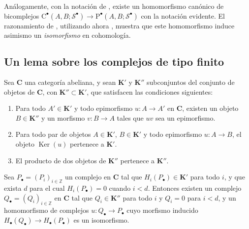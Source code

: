 \begin{env}[11.8.10]
\label{0.11.8.10}
\label{0.11.8.10-fr}
Análogamente, con la notación de , existe un
homomorfismo canónico de bicomplejos
$\mathrm C^\bullet(A,B;\mathscr S^\bullet)\to
\mathrm P^\bullet(A,B;\mathscr S^\bullet)$
con la notación evidente.
El razonamiento de , utilizando ahora , muestra que
este homomorfismo induce asimismo un \emph{isomorfismo} en cohomología.
\end{env}

\subsection{Un lema sobre los complejos de tipo finito}
\label{subsection:0.11.9}
\label{subsection:0.11.9-fr}

\begin{proposition}[11.9.1]
\label{0.11.9.1}
\label{0.11.9.1-fr}
Sea $\boldsymbol{C}$ una categoría abeliana, y sean $\boldsymbol{K}'$ y $\boldsymbol{K}''$ subconjuntos
del conjunto de objetos de $\boldsymbol{C}$, con $\boldsymbol{K}''\subset\boldsymbol{K}'$, que satisfacen las
condiciones siguientes:
\begin{enumerate}
  \item[{\rm(i)}]
  Para todo $A'\in\boldsymbol{K}'$ y todo epimorfismo $u:A\to A'$ en
  $\boldsymbol{C}$, existen un objeto $B\in\boldsymbol{K}''$ y un morfismo $v:B\to A$ tales que $uv$ sea un epimorfismo.
\item[{\rm(ii)}] Para todo par de objetos $A\in\boldsymbol{K}'$, $B\in\boldsymbol{K}'$ y todo epimorfismo $u:A\to B$,
  el objeto $\operatorname{Ker}(u)$ pertenece a $\boldsymbol{K}'$.

  \item[{\rm(iii)}]
  El producto de dos objetos de $\boldsymbol{K}''$ pertenece a $\boldsymbol{K}''$.
\end{enumerate}

Sea $P_\bullet=(P_i)_{i\in\mathbb Z}$ un complejo en $\boldsymbol{C}$ tal
que $H_i(P_\bullet)\in\boldsymbol{K}'$ para todo $i$, y que exista $d$ para el cual $H_i(P_\bullet)=0$ cuando $i<d$.
Entonces existen un complejo $Q_\bullet=(Q_i)_{i\in\mathbb Z}$ en $\boldsymbol{C}$
tal que $Q_i\in\boldsymbol{K}''$ para todo $i$ y $Q_i=0$ para $i<d$, y un
homomorfismo de complejos
$u:Q_\bullet\to P_\bullet$
cuyo morfismo inducido
$H_\bullet(Q_\bullet)\to H_\bullet(P_\bullet)$
es un isomorfismo.
\end{proposition}

